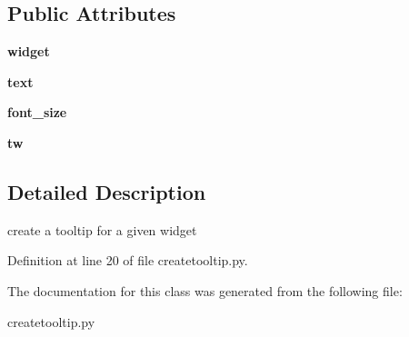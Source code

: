 \subsection*{Public Attributes}
\begin{DoxyCompactItemize}
\item 
{\bfseries widget}\hypertarget{classnegui_1_1createtooltip_1_1CreateToolTip_a6619448e568b135261fd02a6d9b36725}{}\label{classnegui_1_1createtooltip_1_1CreateToolTip_a6619448e568b135261fd02a6d9b36725}

\item 
{\bfseries text}\hypertarget{classnegui_1_1createtooltip_1_1CreateToolTip_a198b3395803def62ec55ed820e756b11}{}\label{classnegui_1_1createtooltip_1_1CreateToolTip_a198b3395803def62ec55ed820e756b11}

\item 
{\bfseries font\+\_\+size}\hypertarget{classnegui_1_1createtooltip_1_1CreateToolTip_a42f2306cb6ad9995d76e0eb556416bed}{}\label{classnegui_1_1createtooltip_1_1CreateToolTip_a42f2306cb6ad9995d76e0eb556416bed}

\item 
{\bfseries tw}\hypertarget{classnegui_1_1createtooltip_1_1CreateToolTip_ac47a0f82a5a354f6c8914c4631d1a0cf}{}\label{classnegui_1_1createtooltip_1_1CreateToolTip_ac47a0f82a5a354f6c8914c4631d1a0cf}

\end{DoxyCompactItemize}


\subsection{Detailed Description}
\begin{DoxyVerb}create a tooltip for a given widget
\end{DoxyVerb}
 

Definition at line 20 of file createtooltip.\+py.



The documentation for this class was generated from the following file\+:\begin{DoxyCompactItemize}
\item 
createtooltip.\+py\end{DoxyCompactItemize}
